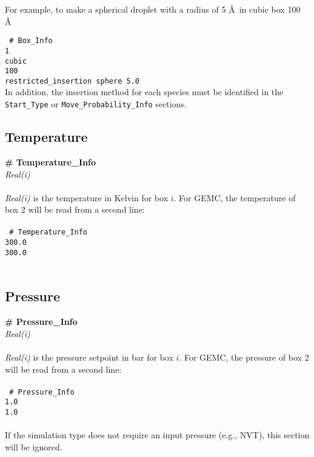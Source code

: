 For example, to make a spherical droplet with a radius of 5 \AA\ in cubic box 100 \AA\

\texttt{
\# Box\_Info \\
	1 \\
	cubic \\
	100 \\
	restricted\_insertion sphere 5.0} \\

In addition, the insertion method for each species must be identified in the 
\texttt{Start\_Type} or \texttt{Move\_Probability\_Info} sections.

%
%
%
%
%
\subsection{Temperature}\label{sec:Temperature_Info}
{\bf \# Temperature\_Info} \\ 
{\it Real(i)} \\ \\
%
{\it Real(i)} is the temperature in Kelvin for box $i$. 
For GEMC, the temperature of box 2 will be read from a second line: \\ \\
%
\texttt{
\# Temperature\_Info \\
 300.0 \\
 300.0} \\ \\
%
%
%
\subsection{Pressure}\label{sec:Pressure_Info}
{\bf \# Pressure\_Info} \\
{\it Real(i)} \\ \\
%
{\it Real(i)} is the pressure setpoint in bar for box $i$.
For GEMC, the pressure of box 2 will be read from a second line: \\ \\
%
\texttt{
\# Pressure\_Info \\
 1.0 \\
 1.0} \\ \\
%
If the simulation type does not require an input pressure (e.g., NVT), this section will be ignored.  
%
%
